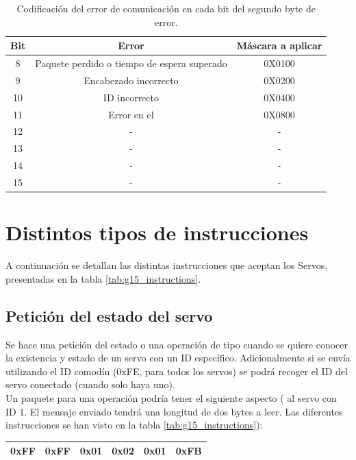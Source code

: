 	\begin{table}[htbp]
		\centering
		\caption{Codificación del error de comunicación en cada bit del segundo byte de error.}
		\label{tab:g15_error_second}
		\begin{center}
			\begin{tabular}{|c|c|c|}
				\hline
				\textbf{Bit} & \textbf{Error} & \textbf{Máscara a aplicar} \\
				\hline
				8 & Paquete perdido o tiempo de espera superado & 0X0100 \\
				\hline
				9 & Encabezado incorrecto & 0X0200 \\
				\hline
				10 & ID incorrecto & 0X0400 \\
				\hline
				11 & Error en el \ingles{CheckSum} & 0X0800 \\
				\hline
				12 & - & -  \\
				\hline
				13 & - & -  \\
				\hline
				14 & - & -  \\
				\hline
				15 & - & -  \\
				\hline
			\end{tabular}
		\end{center}
	\end{table}
	\section{Distintos tipos de instrucciones}
	A continuación se detallan las distintas instrucciones que aceptan los Servos, presentadas en la tabla \ref{tab:g15_instructions}.
	\subsection{Petición del estado del servo}

	Se hace una petición del estado o una operación de tipo  cuando se quiere conocer la existencia y estado de un servo con un ID específico. Adicionalmente si se envía utilizando el ID comodín (0xFE, para todos los servos) se podrá recoger el ID del servo conectado (cuando solo haya uno).
	\\

	Un paquete para una operación  podría tener el siguiente aspecto ( al servo con ID 1. El mensaje enviado tendrá una longitud de dos bytes a leer. Las diferentes instrucciones se han visto en la tabla \ref{tab:g15_instructions}):
	\begin{center}
		\begin{tabular}{|c|c|c|c|c|c|}
			\hline
			0xFF & 0xFF & 0x01 & 0x02 & 0x01 & 0xFB \\
			\hline
		\end{tabular}
	\end{center}

